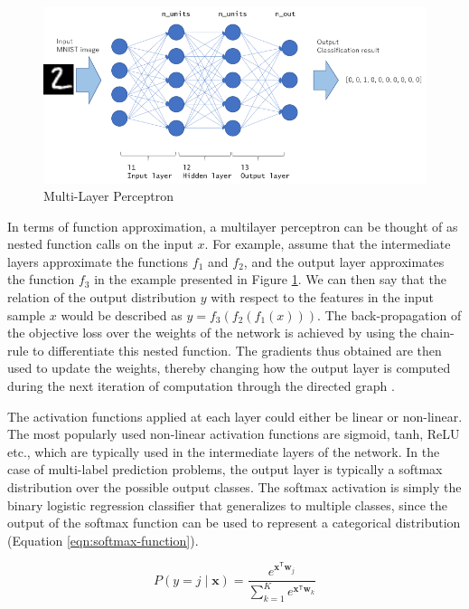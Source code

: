 \begin{figure}[ht]
	\centering
	\includegraphics[width=\textwidth]{images/mlp-network}
	\caption{\label{fig:mlp-network} Multi-Layer Perceptron}
\end{figure}

In terms of function approximation, a multilayer perceptron can be thought of as nested function calls on the input $x$. For example, assume that the intermediate layers approximate the functions $f_1$ and $f_2$, and the output layer approximates the function $f_3$ in the example presented in Figure \ref{fig:mlp-network}. We can then say that the relation of the output distribution $y$ with respect to the features in the input sample $x$ would be described as $y = f_3(f_2(f_1(x)))$. The back-propagation of the objective loss over the weights of the network is achieved by using the chain-rule to differentiate this nested function. The gradients thus obtained are then used to update the weights, thereby changing how the output layer is computed during the next iteration of computation through the directed graph \citep{lecun1989backpropagation}.

The activation functions applied at each layer could either be linear or non-linear. The most popularly used non-linear activation functions are sigmoid, tanh, ReLU etc., which are typically used in the intermediate layers of the network. In the case of multi-label prediction problems, the output layer is typically a softmax distribution over the possible output classes. The softmax activation is simply the binary logistic regression classifier that generalizes to multiple classes, since the output of the softmax function can be used to represent a categorical distribution (Equation \ref{eqn:softmax-function}).

\begin{equation} \label{eqn:softmax-function}
	P(y=j \mid \mathbf{x}) = \frac{e^{\mathbf{x}^\mathsf{T}\mathbf{w}_j}}{\sum_{k=1}^K e^{\mathbf{x}^\mathsf{T}\mathbf{w}_k}}
\end{equation}

